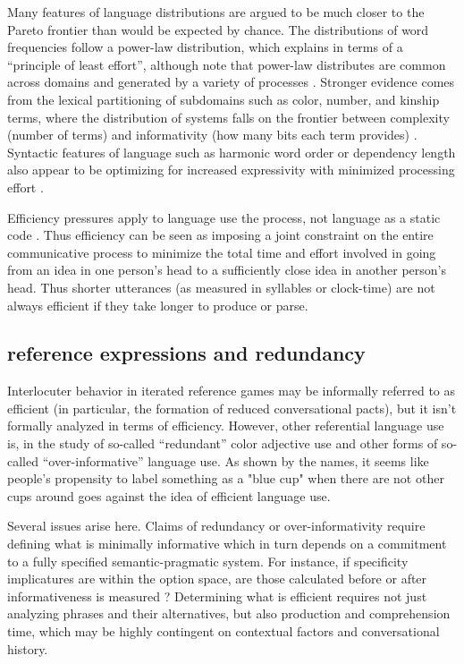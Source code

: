 \documentclass[]{article}
\begin{document}
Many features of language distributions are argued to be much closer to the Pareto frontier than would be expected by chance. The distributions of word frequencies follow a power-law distribution, which \cite{zipf1949} explains in terms of a ``principle of least effort'', although note that power-law distributes are common across domains and generated by a variety of processes \cite{piantadosi2014}. Stronger evidence comes from the lexical partitioning of subdomains such as color, number, and kinship terms, where the distribution of systems falls on the frontier between complexity (number of terms) and informativity (how many bits each term provides) \cite{keysar2000, gibson2019}. Syntactic features of language such as harmonic word order or dependency length also appear to be optimizing for increased expressivity with minimized processing effort \cite{gibson2019, hawkins1995}. 
	
Efficiency pressures apply to language use the process, not language as a static code \cite{gibson2019}. Thus efficiency can be seen as imposing a joint constraint on the entire communicative process to minimize the total time and effort involved in going from an idea in one person's head to a sufficiently close idea in another person's head. Thus shorter utterances (as measured in syllables or clock-time) are not always efficient if they take longer to produce or parse. 

\subsection{reference expressions and redundancy}
Interlocuter behavior in iterated reference games may be informally referred to as efficient (in particular, the formation of reduced conversational pacts), but it isn't formally analyzed in terms of efficiency. However, other referential language use is, in the study of so-called  ``redundant'' color adjective use and other forms of so-called ``over-informative'' language use. As shown by the names, it seems like people's propensity to label something as a "blue cup" when there are not other cups around goes against the idea of efficient language use. 

Several issues arise here. Claims of redundancy or over-informativity require defining what is minimally informative which in turn depends on a commitment to a fully specified semantic-pragmatic system. For instance, if specificity implicatures are within the option space, are those calculated before or after informativeness is measured \cite{bergen}? Determining what is efficient requires not just analyzing phrases and their alternatives, but also production and comprehension time, which may be highly contingent on contextual factors and conversational history. 
\end{document}
